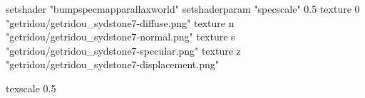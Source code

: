 setshader "bumpspecmapparallaxworld"
setshaderparam "specscale" 0.5
texture 0 "getridou/getridou_sydstone7-diffuse.png"
texture n "getridou/getridou_sydstone7-normal.png"
texture s "getridou/getridou_sydstone7-specular.png"
texture z "getridou/getridou_sydstone7-displacement.png"

texscale 0.5
